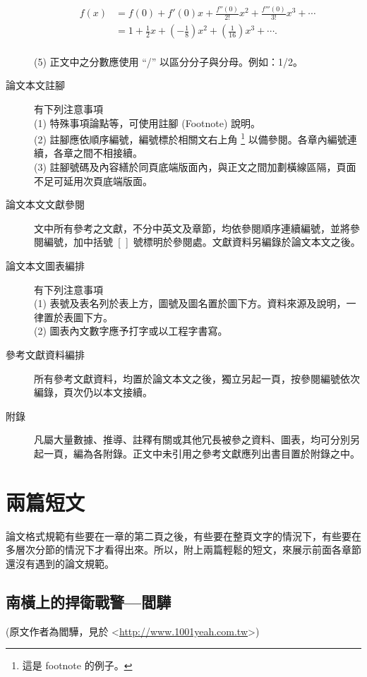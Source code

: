 \begin{description}
\begin{equation}
\begin{split}
f(x) &= f(0) + f'(0)x + \frac{f''(0)}{2!}x^2 + \frac{f'''(0)}{3!}x^3 +\cdots \\
    &=1+\frac{1}{2}x+\left(-\frac{1}{8}\right)x^{2}+\left(\frac{1}{16}\right)x^{3}+\cdots.
\end{split}
\end{equation}\\
(5) 正文中之分數應使用 ``/'' 以區分分子與分母。例如：1/2。
\item[論文本文註腳] 有下列注意事項\\
(1) 特殊事項論點等，可使用註腳 (Footnote) 說明。\\
(2) 註腳應依順序編號，編號標於相關文右上角%
\footnote{這是 footnote 的例子。}%
以備參閱。各章內編號連續，各章之間不相接續。\\
(3) 註腳號碼及內容繕於同頁底端版面內，與正文之間加劃橫線區隔，頁面不足可延用次頁底端版面。
\item[論文本文文獻參閱] 文中所有參考之文獻，不分中英文及章節，均依參閱順序連續編號，並將參閱編號，加中括號~[~]~號標明於參閱處。文獻資料另編錄於論文本文之後。
\item[論文本文圖表編排] 有下列注意事項\\
(1) 表號及表名列於表上方，圖號及圖名置於圖下方。資料來源及說明，一律置於表圖下方。\\
(2) 圖表內文數字應予打字或以工程字書寫。
\item[參考文獻資料編排] 所有參考文獻資料，均置於論文本文之後，獨立另起一頁，按參閱編號依次編錄，頁次仍以本文接續。
\item[附錄] 凡屬大量數據、推導、註釋有關或其他冗長被參之資料、圖表，均可分別另起一頁，編為各附錄。正文中未引用之參考文獻應列出書目置於附錄之中。
\end{description}

\chapter{兩篇短文}
論文格式規範有些要在一章的第二頁之後，有些要在整頁文字的情況下，有些要在多層次分節的情況下才看得出來。所以，附上兩篇輕鬆的短文，來展示前面各章節還沒有遇到的論文規範。

\section{南橫上的捍衛戰警—閻驊}
\label{speed}
(原文作者為閻驊，見於 \textless{}\url{http://www.1001yeah.com.tw}\textgreater{})

